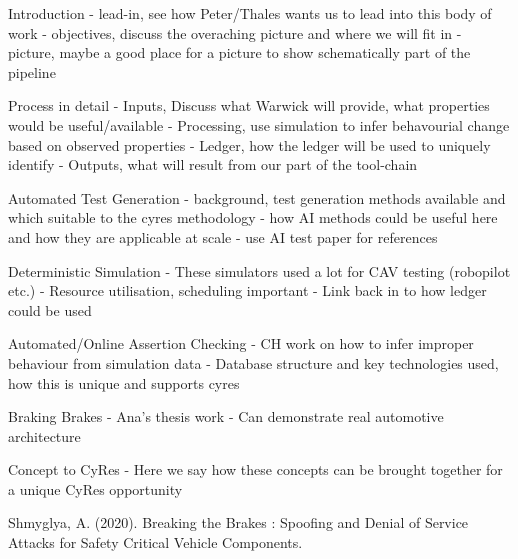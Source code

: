 





Introduction
- lead-in, see how Peter/Thales wants us to lead into this body of work
- objectives, discuss the overaching picture and where we will fit in
- picture, maybe a good place for a picture to show schematically part of the pipeline

Process in detail
- Inputs, Discuss what Warwick will provide, what properties would be useful/available
- Processing, use simulation to infer behavourial change based on observed properties
- Ledger, how the ledger will be used to uniquely identify 
- Outputs, what will result from our part of the tool-chain

Automated Test Generation
- background, test generation methods available and which suitable to the cyres methodology
- how AI methods could be useful here and how they are applicable at scale
- use AI test paper for references

Deterministic Simulation
- These simulators used a lot for CAV testing (robopilot etc.)
- Resource utilisation, scheduling important
- Link back in to how ledger could be used

Automated/Online Assertion Checking
- CH work on how to infer improper behaviour from simulation data
- Database structure and key technologies used, how this is unique and supports cyres

Braking Brakes
- Ana's thesis work
- Can demonstrate real automotive architecture

Concept to CyRes
- Here we say how these concepts can be brought together for a unique CyRes opportunity






Shmyglya, A. (2020). Breaking the Brakes : Spoofing and Denial of Service Attacks for Safety Critical Vehicle Components.
